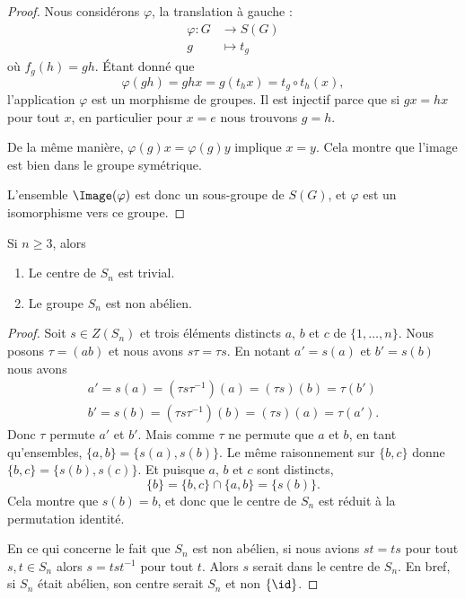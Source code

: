 \begin{proof}
	Nous considérons \( \varphi\), la translation à gauche :
	\begin{equation}
		\begin{aligned}
			\varphi\colon G & \to S(G)    \\
			g               & \mapsto t_g
		\end{aligned}
	\end{equation}
	où \( f_g(h)=gh\). Étant donné que
	\begin{equation}
		\varphi(gh)= ghx=g(t_hx)=t_g\circ t_h(x),
	\end{equation}
	l'application \( \varphi\) est un morphisme de groupes. Il est injectif parce que si \( gx=hx\) pour tout \( x\), en particulier pour \( x=e\) nous trouvons \( g=h\).

	De la même manière, \( \varphi(g)x=\varphi(g)y\) implique \( x=y\). Cela montre que l'image est bien dans le groupe symétrique.

	L'ensemble \( \Image(\varphi)\) est donc un sous-groupe de \( S(G)\), et \( \varphi\) est un isomorphisme vers ce groupe.
\end{proof}

\begin{lemma}       \label{LEMooMVUGooRiDaDz}
	Si \( n\geq 3\), alors
	\begin{enumerate}
		\item
		      Le centre de \( S_n\) est trivial.
		\item
		      Le groupe \( S_n\) est non abélien.
	\end{enumerate}
\end{lemma}

\begin{proof}
	Soit \( s\in Z(S_n)\) et trois éléments distincts \( a\),  \( b\) et \( c\) de \( \{ 1,\ldots, n \}\). Nous posons \( \tau=(ab)\) et nous avons \( s\tau=\tau s\). En notant \( a'=s(a)\) et \( b'=s(b)\) nous avons
	\begin{subequations}
		\begin{align}
			a'=s(a)=(\tau s\tau^{-1})(a)=(\tau s)(b)=\tau(b') \\
			b'=s(b)=(\tau s\tau^{-1})(b)=(\tau s)(a)=\tau(a').
		\end{align}
	\end{subequations}
	Donc \( \tau\) permute \( a'\) et \( b'\). Mais comme \( \tau\) ne permute que \( a\) et \( b\), en tant qu'ensembles, \( \{ a,b \}=\{ s(a), s(b) \}\). Le même raisonnement sur \( \{ b,c \}\) donne \( \{ b,c \}=\{ s(b),s(c) \}\). Et puisque \( a\), \( b\) et \( c\) sont distincts,
	\begin{equation}
		\{ b \}=\{ b,c \}\cap\{ a,b \}=\{ s(b) \}.
	\end{equation}
	Cela montre que \( s(b)=b\), et donc que le centre de \( S_n\) est réduit à la permutation identité.

	En ce qui concerne le fait que \( S_n\) est non abélien, si nous avions \( st=ts\) pour tout \( s,t\in S_n\) alors \( s=tst^{-1}\) pour tout \( t\). Alors \( s\) serait dans le centre de \( S_n\). En bref, si \( S_n\) était abélien, son centre serait \( S_n\) et non \( \{ \id \}\).

\end{proof}

